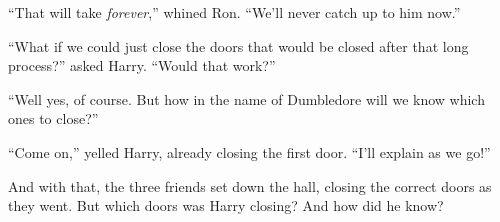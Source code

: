 \documentclass[11pt]{exam}
\begin{document}
\begin{questions}
  ``That will take {\it forever},'' whined Ron.  ``We'll never catch up to him now.''

  ``What if we could just close the doors that would be closed after that long process?'' asked Harry.  ``Would that work?''

  ``Well yes, of course.  But how in the name of Dumbledore will we know which ones to close?''

  ``Come on,'' yelled Harry, already closing the first door.  ``I'll explain as we go!''

  And with that, the three friends set down the hall, closing the correct doors as they went.  But which doors was Harry closing?  And how did he know?
\end{questions}
\end{document}
